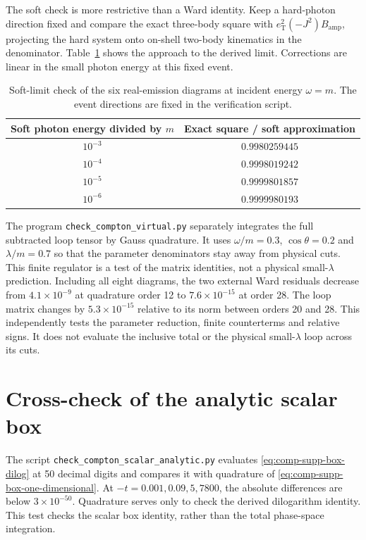 The soft check is more restrictive than a Ward identity. Keep a
hard-photon direction fixed and compare the exact three-body square
with $e_{\mathrm T}^2(-J^2)B_{\mathrm{amp}}$, projecting the hard system onto
on-shell two-body kinematics in the denominator. Table~\ref{tab:comp-supp-soft}
shows the approach to the derived limit. Corrections are linear in
the small photon energy at this fixed event.
\begin{table}[!htbp]
\centering
\begin{tabular}{cc}
\toprule
Soft photon energy divided by $m$ & Exact square / soft approximation\\
\midrule
$10^{-3}$ & $0.9980259445$\\
$10^{-4}$ & $0.9998019242$\\
$10^{-5}$ & $0.9999801857$\\
$10^{-6}$ & $0.9999980193$\\
\bottomrule
\end{tabular}
\caption{Soft-limit check of the six real-emission diagrams at
incident energy $\omega=m$. The event directions are fixed in the
verification script.}
\label{tab:comp-supp-soft}
\end{table}
The program \texttt{check\_compton\_virtual.py} separately integrates
the full subtracted loop tensor by Gauss quadrature. It uses
$\omega/m=0.3$, $\cos\theta=0.2$ and $\lambda/m=0.7$ so that
the parameter denominators stay away from physical cuts. This
finite regulator is a test of the matrix identities, not a physical
small-$\lambda$ prediction. Including all eight diagrams, the two
external Ward residuals decrease from $4.1\times10^{-9}$ at
quadrature order 12 to $7.6\times10^{-15}$ at order 28. The loop
matrix changes by $5.3\times10^{-15}$ relative to its norm between
orders 20 and 28. This independently tests the parameter reduction,
finite counterterms and relative signs. It does not evaluate the
inclusive total or the physical small-$\lambda$ loop across its cuts.

\section{Cross-check of the analytic scalar box}
The script \texttt{check\_compton\_scalar\_analytic.py} evaluates
\eqref{eq:comp-supp-box-dilog} at 50 decimal digits and compares it
with quadrature of \eqref{eq:comp-supp-box-one-dimensional}.
At $-t=0.001,0.09,5,7800$, the absolute differences are below
$3\times10^{-50}$. Quadrature serves only to check the derived
dilogarithm identity. This test checks the scalar box identity, rather than the total
phase-space integration.

